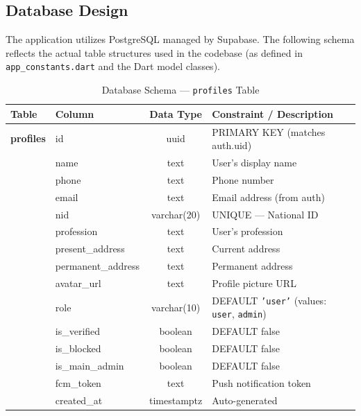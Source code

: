 \documentclass[12pt, a4paper, twoside]{report}
\begin{document}
\subsection{Database Design}
The application utilizes PostgreSQL managed by Supabase. The following schema reflects the actual table structures used in the codebase (as defined in \texttt{app\_constants.dart} and the Dart model classes).
\begin{table}[ht]
\centering
\caption{Database Schema --- \texttt{profiles} Table}
\label{tab:profiles}
\begin{tabularx}{\textwidth}{p{3cm} p{3cm} c X}
\toprule
\textbf{Table} & \textbf{Column} & \textbf{Data Type} & \textbf{Constraint / Description} \\
\midrule
\textbf{profiles} & id & uuid & PRIMARY KEY (matches auth.uid) \\
& name & text & User's display name \\
& phone & text & Phone number \\
& email & text & Email address (from auth) \\
& nid & varchar(20) & UNIQUE --- National ID \\
& profession & text & User's profession \\
& present\_address & text & Current address \\
& permanent\_address & text & Permanent address \\
& avatar\_url & text & Profile picture URL \\
& role & varchar(10) & DEFAULT \texttt{'user'} (values: \texttt{user}, \texttt{admin}) \\
& is\_verified & boolean & DEFAULT false \\
& is\_blocked & boolean & DEFAULT false \\
& is\_main\_admin & boolean & DEFAULT false \\
& fcm\_token & text & Push notification token \\
& created\_at & timestamptz & Auto-generated \\
\bottomrule
\end{tabularx}
\end{table}
\end{document}
